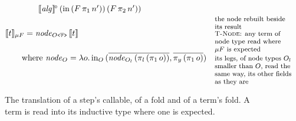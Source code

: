 \begin{figure}[htbp]
\[\begin{array}{@{}l@{\quad}l@{}}
\qquad\qquad \llbracket \mathit{alg} \rrbracket^{\!\circ}\,(\mathrm{in}\,(F\,\pi_1\,n'))\,(F\,\pi_2\,n')) & \\
\qquad & \note{the node rebuilt beside its result} \\
\llbracket t \rrbracket_{\mu F} = \mathit{node}_{O\texttt{<}\overline{\tau}\texttt{>}}\,\llbracket t \rrbracket & \note{\textsc{T-Node}: any term of node type read where $\mu F$  is expected} \\
\qquad \text{where } \mathit{node}_{O} = \lambda o.\,\mathrm{in}_O\,(\overline{\mathit{node}_{O_l}\,(\pi_l\,(\pi_1\,o))}, \overline{\pi_y\,(\pi_1\,o)}) & \note{its legs, of node types $O_l$  smaller than $O$, read the same way, its other fields as they are} \\
\end{array}
\]
\caption{The translation of a step's callable, of a fold and of a term's fold.
A term is read into its inductive type where one is expected.}
\label{fig:fjlt-recursion}
\end{figure}

